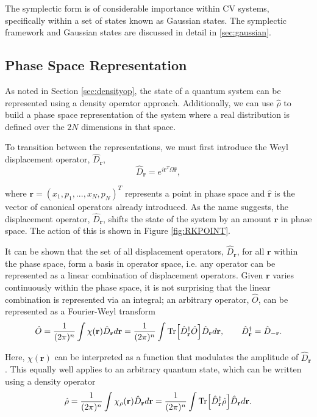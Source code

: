 \documentclass[11pt,a4paper]{article}
\numberwithin{equation}{section}
\begin{document}
	The symplectic form is of considerable importance within CV systems, specifically within a set of states known as Gaussian states. The symplectic framework and Gaussian states are discussed in detail in \ref{sec:gaussian}. 
	
	\subsection{Phase Space Representation}
	
	As noted in Section \ref{sec:densityop}, the state of a quantum system can be represented using a density operator approach. Additionally, we can use $\hat{\rho}$ to build a phase space representation of the system where a real distribution is defined over the $2N$ dimensions in that space. 
	
	To transition between the representations, we must first introduce the  Weyl displacement operator, $\hat{D}_\textbf{r}$, \cite{Olivares12}
	\begin{equation} \label{eq:13}
	\hat{D}_\mathbf{r} = e^{i\mathbf{r}^{T}\Omega\mathbf{\hat{r}}}, 
	\end{equation}
	
	where $\mathbf{r} = (x_1, p_1, ..., x_N, p_N)^T $ represents a point in phase space and $\mathbf{\hat{r}}$ is the vector of canonical operators already introduced. As the name suggests, the displacement operator, $\hat{D}_\mathbf{r}$, shifts the state of the system by an amount $\mathbf{r}$ in phase space. The action of this is shown in Figure \ref{fig:RKPOINT}. 
	
	It can be shown that the set of all displacement operators, $\hat{D}_\mathbf{r}$, for all $\mathbf{r}$ within the phase space, form a basis in operator space, i.e. any operator can be represented as a linear combination of displacement operators. Given $\mathbf{r}$ varies continuously within the phase space, it is not surprising that the linear combination is represented via an integral; an arbitrary operator, $\hat{O}$, can be represented as a Fourier-Weyl transform \cite{Cahill68}
	\begin{equation} \label{eq:14}
	\hat{O} = \frac{1}{(2\pi)^n}\int \chi(\mathbf{r})\hat{D}_\textbf{r}  d\textbf{r} = \frac{1}{(2\pi)^n} \int \Tr[\hat{D}_\textbf{r}^\dagger\hat{O}]\hat{D}_\textbf{r}  d\textbf{r}, \qquad \hat{D}_\mathbf{r}^\dagger  = \hat{D}_\mathbf{-r}.
	\end{equation}  
	
	Here, $\chi(\mathbf{r})$ can be interpreted as a function that modulates the amplitude of $\hat{D}_\textbf{r}$. This equally well applies to an arbitrary quantum state, which can be written using a density operator
	\begin{equation} \label{eq:15}
	\hat{\rho} = \frac{1}{(2\pi)^n} \int \chi_\rho(\mathbf{r})\hat{D}_\textbf{r}  d\textbf{r} = \frac{1}{(2\pi)^n} \int \Tr[\hat{D}_\textbf{r}^\dagger \hat{\rho}]\hat{D}_\textbf{r}  d\textbf{r}.
	\end{equation} 
	
\end{document}
